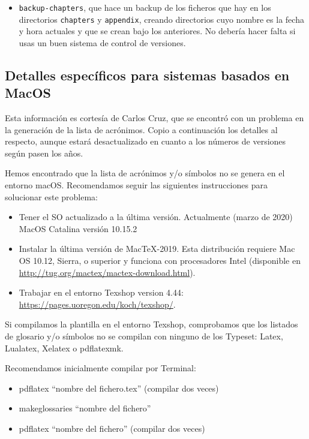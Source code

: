 {\begin{itemize}
\begin{itemize}
            \item \texttt{backup-chapters}, que hace un backup de los ficheros que hay en los directorios \texttt{chapters} y \texttt{appendix}, creando directorios cuyo nombre es la fecha y hora actuales y que se crean bajo los anteriores. No debería hacer falta si usas un buen sistema de control de versiones.
          \end{itemize}

  \end{itemize}


  \subsection{Detalles específicos para sistemas basados en MacOS}
  \label{sec:detall-espec-para}

  Esta información es cortesía de Carlos Cruz, que se encontró con un problema en la generación de la lista de acrónimos. Copio a continuación los detalles al respecto, aunque estará desactualizado en cuanto a los números de versiones según pasen los años.

  Hemos encontrado que la lista de acrónimos y/o símbolos no se genera en el entorno macOS. Recomendamos seguir las siguientes instrucciones para solucionar este problema:

  \begin{itemize}
    \item Tener el SO actualizado a la última versión. Actualmente (marzo de 2020) MacOS Catalina versión 10.15.2
    \item Instalar la última versión de MacTeX-2019. Esta distribución requiere Mac OS 10.12, Sierra, o superior y funciona con procesadores Intel (disponible en \href{http://tug.org/mactex/mactex-download.html}{http://tug.org/mactex/mactex-download.html}).
    \item Trabajar en el entorno Texshop version 4.44: \href{https://pages.uoregon.edu/koch/texshop/}{https://pages.uoregon.edu/koch/texshop/}.
  \end{itemize}

  Si compilamos la plantilla en el entorno Texshop, comprobamos que los listados de glosario y/o símbolos no se compilan con ninguno de los Typeset: Latex, Lualatex, Xelatex o pdflatexmk.

  Recomendamos inicialmente compilar por Terminal:

  \begin{itemize}
    \item pdflatex “nombre del fichero.tex” (compilar dos veces)
    \item makeglossaries “nombre del fichero”
    \item pdflatex “nombre del fichero” (compilar dos veces)
  \end{itemize}

}
